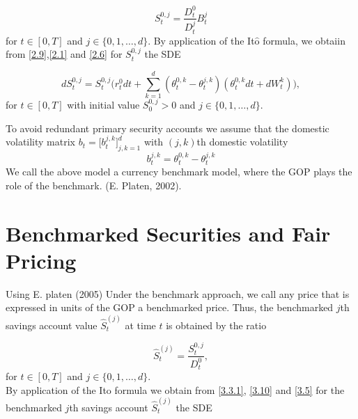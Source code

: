 \documentclass[a4 paper, 12pt]{report}
\theoremstyle{plain}
\begin{document}
\begin{equation}\label{3.9}
S_t^{0,j} = \frac{D_t^0}{D_t^j}B_t^j
\end{equation}
for $t\in[0,T]$ and $j\in\{0,1,\ldots,d\}$. By application of the It$\hat{\mbox{o}}$ formula, we obtaiin from \eqref{2.9},\eqref{2.1} and \eqref{2.6} for $S_t^{0,j}$ the SDE

\begin{equation}\label{3.10}
dS_t^{0,j} = S_t^{0,j}\bigg(r_t^0dt+\sum_{k = 1}^d(\theta_t^{0,k}-\theta_t^{j,k})(\theta_t^{0,k}dt+dW_t^k)\bigg),
\end{equation}
for $t\in [0,T]$ with initial value $S_0^{0,j}>0$ and $j\in\{0,1,\ldots,d\}$.\\
\par To avoid redundant primary security accounts we assume that the domestic volatility matrix $b_t = \bigg[b_t^{j,k}\bigg]^d_{j,k = 1}$ with $(j,k)$th domestic volatility
\begin{equation}\label{2.11}
b_t^{j,k} = \theta_{t}^{0,k} - \theta_t^{j,k}
\end{equation}
We call the above model a currency benchmark model, where the GOP plays
the role of the benchmark. (E. Platen, 2002).
\section{Benchmarked Securities and Fair Pricing}
\noindent
\par Using E. platen (2005) Under the benchmark approach, we call any price that is expressed in units of the GOP a benchmarked price. Thus, the benchmarked $j$th
savings account value $\hat{S}^{(j)}_t$ at time $t$ is obtained by the ratio


\begin{equation}\label{3.3.1}
\hat{S}_t^{(j)} = \frac{S_t^{0,j}}{D_t^0},
\end{equation}
for $t\in [0,T]$ and $j\in\{0,1,\ldots,d\}.$\\
By application of the Ito formula we obtain from \eqref{3.3.1}, \eqref{3.10} and \eqref{3.5} for the benchmarked $j$th savings account $\hat{S}_t^{(j)}$  the SDE
\end{document}
